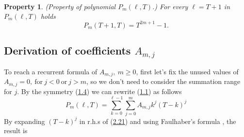 \documentclass[11pt, letterpaper]{amsart}
\newtheorem{ppty}[thm]{Property}
\theoremstyle{definition}
\theoremstyle{remark}
\numberwithin{equation}{section}
\begin{document}
\begin{ppty} (Property of polynomial $P_m(\ell,T)$.)
For every $\ell=T+1$ in $P_m(\ell,T)$ holds
\begin{equation*}
P_m(T+1,T)=T^{2m+1}-1.
\end{equation*}
\end{ppty}
\subsection{Derivation of coefficients \texorpdfstring{$A_{m,j}$}{A(m,j)}}
To reach a recurrent formula of $A_{m,j}, \ m\geq0$, first let's fix the unused values of $A_{m,j}=0, \ \mathrm{for} \ j<0 \ \mathrm{or} \ j>m$, so we don't need to consider the summation range for $j$. By the symmetry (\hyperref[symmetry_2]{1.4}) we can rewrite (\hyperref[f1]{1.1}) as follows
\begin{equation}\label{gen_5_2}
P_m(\ell,T)=\sum_{k=0}^{\ell-1}\sum_{j=0}^m A_{m,j}k^j(T-k)^j
\end{equation}
By expanding $(T-k)^j$ in r.h.s of (\hyperref[gen_5_2]{2.21}) and using Faulhaber's formula \cite{11}, the result is
\end{document}
